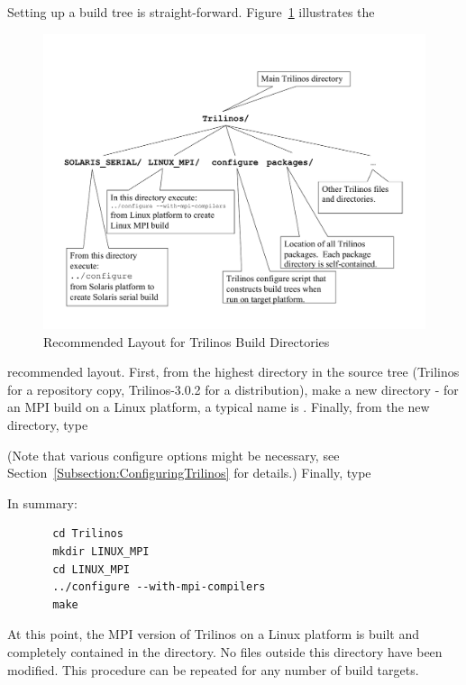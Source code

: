 Setting up a build tree is straight-forward.
Figure~\ref{Figure:TrilinosDirectoryStructure} illustrates the
\begin{figure}
\begin{center}
\includegraphics[width=6in]{../CommonFiles/TrilinosDirectoryStructure}
\end{center}
\caption{\label{Figure:TrilinosDirectoryStructure}Recommended Layout for Trilinos Build Directories}
\end{figure}recommended layout.  First, from the highest 
directory in the source tree (Trilinos for a repository copy, Trilinos-3.0.2 
for a distribution), make a new directory - for an MPI build
on a Linux platform, a 
typical name is .  
Finally, from the new directory, type


(Note that various configure options might be necessary, see Section~\ref{Subsection:ConfiguringTrilinos} for details.)  Finally, type



In summary:

\begin{verbatim}
       cd Trilinos
       mkdir LINUX_MPI
       cd LINUX_MPI
       ../configure --with-mpi-compilers
       make
\end{verbatim}
At this point, the MPI version of Trilinos on a Linux platform is
built and completely contained in the 
directory.  No files outside this directory have been modified.  This
procedure can be repeated for any number of build targets.

